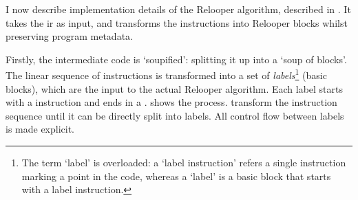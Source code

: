 \documentclass[00-main.tex]{subfiles}
\begin{document}
I now describe implementation details of the Relooper algorithm, described in .
It takes the \gls{ir} as input, and transforms the instructions into Relooper blocks whilst preserving program metadata.

Firstly, the intermediate code is `soupified': splitting it up into a `soup of blocks'.
The linear sequence of instructions is transformed into a set of \emph{labels}\footnote{The term `label' is overloaded: a `label instruction' refers a single instruction marking a point in the code, whereas a `label' is a basic block that starts with a label instruction.} (basic blocks), which are the input to the actual Relooper algorithm.
Each label starts with a  instruction and ends in a .
 shows the process.
 transform the instruction sequence until it can be directly split into labels.
All control flow between labels is made explicit.
\end{document}
